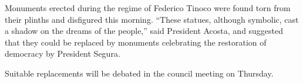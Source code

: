 
Monuments erected during the regime of Federico Tinoco were found torn
from their plinths and disfigured this morning.  ``These statues,
although symbolic, cast a shadow on the dreams of the people,'' said
President Acosta, and suggested that they could be replaced by
monuments celebrating the restoration of democracy by President
Segura.

Suitable replacements will be debated in the council meeting on
Thursday.
